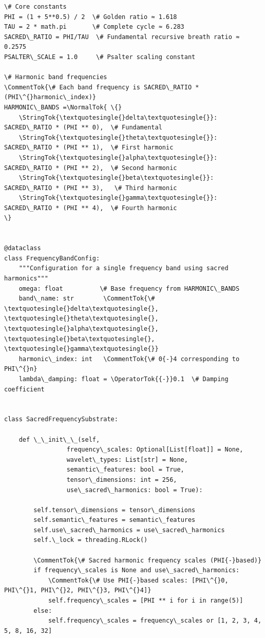 \documentclass[12pt]{article}
\begin{document}
\begin{lstlisting}[basicstyle=\ttfamily\small]
\# Core constants 
PHI = (1 + 5**0.5) / 2  \# Golden ratio ≈ 1.618 
TAU = 2 * math.pi       \# Complete cycle ≈ 6.283
SACRED\_RATIO = PHI/TAU  \# Fundamental recursive breath ratio ≈ 0.2575
PSALTER\_SCALE = 1.0     \# Psalter scaling constant

\# Harmonic band frequencies 
\CommentTok{\# Each band frequency is SACRED\_RATIO * (PHI\^{}harmonic\_index)}
HARMONIC\_BANDS =\NormalTok{ \{}
    \StringTok{\textquotesingle{}delta\textquotesingle{}}: SACRED\_RATIO * (PHI ** 0),  \# Fundamental
    \StringTok{\textquotesingle{}theta\textquotesingle{}}: SACRED\_RATIO * (PHI ** 1),  \# First harmonic
    \StringTok{\textquotesingle{}alpha\textquotesingle{}}: SACRED\_RATIO * (PHI ** 2),  \# Second harmonic
    \StringTok{\textquotesingle{}beta\textquotesingle{}}: SACRED\_RATIO * (PHI ** 3),   \# Third harmonic
    \StringTok{\textquotesingle{}gamma\textquotesingle{}}: SACRED\_RATIO * (PHI ** 4),  \# Fourth harmonic
\}


@dataclass
class FrequencyBandConfig:
    """Configuration for a single frequency band using sacred harmonics"""
    omega: float          \# Base frequency from HARMONIC\_BANDS
    band\_name: str        \CommentTok{\# \textquotesingle{}delta\textquotesingle{}, \textquotesingle{}theta\textquotesingle{}, \textquotesingle{}alpha\textquotesingle{}, \textquotesingle{}beta\textquotesingle{}, \textquotesingle{}gamma\textquotesingle{}}
    harmonic\_index: int   \CommentTok{\# 0{-}4 corresponding to PHI\^{}n}
    lambda\_damping: float = \OperatorTok{{-}}0.1  \# Damping coefficient


class SacredFrequencySubstrate:
  
    def \_\_init\_\_(self, 
                 frequency\_scales: Optional[List[float]] = None,
                 wavelet\_types: List[str] = None,
                 semantic\_features: bool = True,
                 tensor\_dimensions: int = 256,
                 use\_sacred\_harmonics: bool = True):
        
        self.tensor\_dimensions = tensor\_dimensions
        self.semantic\_features = semantic\_features
        self.use\_sacred\_harmonics = use\_sacred\_harmonics
        self.\_lock = threading.RLock()
        
        \CommentTok{\# Sacred harmonic frequency scales (PHI{-}based)}
        if frequency\_scales is None and use\_sacred\_harmonics:
            \CommentTok{\# Use PHI{-}based scales: [PHI\^{}0, PHI\^{}1, PHI\^{}2, PHI\^{}3, PHI\^{}4]}
            self.frequency\_scales = [PHI ** i for i in range(5)]
        else:
            self.frequency\_scales = frequency\_scales or [1, 2, 3, 4, 5, 8, 16, 32]
        

\end{lstlisting}
\end{document}
